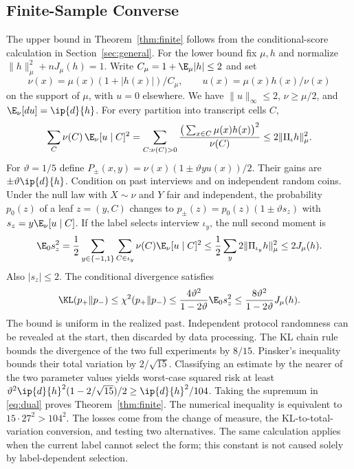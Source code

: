 \subsection{Finite-Sample Converse}
The upper bound in Theorem~\ref{thm:finite} follows from the conditional-score calculation in Section~\ref{sec:general}. For the lower bound fix $\mu,h$ and normalize $\|h\|_\mu^2+nJ_\mu(h)=1$. Write $C_\mu=1+\E_\mu|h|\le2$ and set
\[
 \nu(x)=\mu(x)(1+|h(x)|)/C_\mu,\qquad
 u(x)=\mu(x)h(x)/\nu(x)
\]
on the support of $\mu$, with $u=0$ elsewhere. We have $\|u\|_\infty\le2$, $\nu\ge\mu/2$, and $\E_\nu[du]=\ip{d}{h}$. For every partition into transcript cells $C$,
\[
 \sum_C \nu(C)\,\E_\nu[u\mid C]^2
  =\sum_{C:\nu(C)>0}\frac{\big(\sum_{x\in C}\mu(x)h(x)\big)^2}{\nu(C)}
  \le 2\|\Pi_\iota h\|_\mu^2 .
\]
For $\vartheta=1/5$ define $P_\pm(x,y)=\nu(x)(1\pm \vartheta y u(x))/2$. Their gains are $\pm \vartheta\ip{d}{h}$. Condition on past interviews and on independent random coins. Under the null law with $X\sim\nu$ and $Y$ fair and independent, the probability $p_0(z)$ of a leaf $z=(y,C)$ changes to $p_\pm(z)=p_0(z)(1\pm \vartheta s_z)$ with $s_z=y\E_\nu[u\mid C]$. If the label selects interview $\iota_y$, the null second moment is
\[
 \E_0s_z^2=\frac12\sum_{y\in\{-1,1\}}\sum_{C\in \iota_y}
       \nu(C)\E_\nu[u\mid C]^2
 \le\frac12\sum_y 2\|\Pi_{\iota_y}h\|_\mu^2\le2J_\mu(h).
\]
Also $|s_z|\le2$. The conditional divergence satisfies
\[
 \KL(p_+\Vert p_-)\le\chi^2(p_+\Vert p_-)
    \le \frac{4\vartheta^2}{1-2\vartheta}\E_0 s_z^2
    \le \frac{8\vartheta^2}{1-2\vartheta}J_\mu(h).
\]
The bound is uniform in the realized past. Independent protocol randomness can be revealed at the start, then discarded by data processing. The KL chain rule bounds the divergence of the two full experiments by $8/15$. Pinsker's inequality bounds their total variation by $2/\sqrt{15}$. Classifying an estimate by the nearer of the two parameter values yields worst-case squared risk at least $\vartheta^2\ip{d}{h}^2(1-2/\sqrt{15})/2\ge\ip{d}{h}^2/104$. Taking the supremum in \eqref{eq:dual} proves Theorem~\ref{thm:finite}. The numerical inequality is equivalent to $15\cdot27^2>104^2$. The losses come from the change of measure, the KL-to-total-variation conversion, and testing two alternatives. The same calculation applies when the current label cannot select the form; this constant is not caused solely by label-dependent selection.

